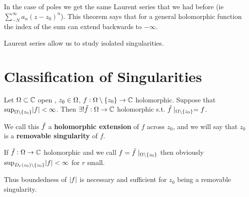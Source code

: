 \begin{remark}
In the case of poles we get the same Laurent series that we had before (ie $\sum_{-N}^\infty a_n (z-z_0)^n$). This theorem says that for a general holomorphic function the index of the sum can extend backwards to $-\infty$.
\end{remark}


Laurent series allow us to study isolated singularities. 

\section{Classification of Singularities}
\begin{theorem}
Let $\Omega \subset \mathbb{C}$ open , $z_0\in \Omega$, $f: \Omega \setminus \{ z_0 \} \to \mathbb{C}$ holomorphic. Suppose that $\sup_{\Omega \setminus \{ z_0 \}}\abs{f} < \infty$. Then $\exists ! \Tilde{f}: \Omega \to \mathbb{C}$ holomorphic s.t. $\Tilde{f}\mid_{\Omega \setminus \{ z_0 \}} = f$.
\end{theorem}
\begin{definition}


We call this $\Tilde{f}$ a \textbf{holomorphic extension} of $f$ across $z_0$, and we will say that $z_0$ is a \textbf{removable singularity} of $f$.

\end{definition}



\begin{remark}
If $\Tilde{f}: \Omega \to \mathbb{C}$ holomorphic and we call $f=\Tilde{f}\mid_{\Omega \setminus \{ z_0 \}}$ then obviously $\sup_{D_r(z_0)\setminus \{z_0\} } \abs{f} < \infty$ for $r$ small.

Thus boundedness of $\, \abs{f}$ is necessary and sufficient for $z_0$ being a removable singularity.
\end{remark}

